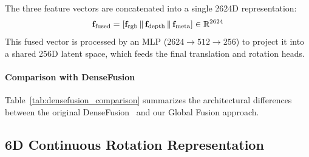 The three feature vectors are concatenated into a single 2624D representation:
\begin{equation}
    \mathbf{f}_{\text{fused}} = [\mathbf{f}_{\text{rgb}} \,\|\, \mathbf{f}_{\text{depth}} \,\|\, \mathbf{f}_{\text{meta}}] \in \mathbb{R}^{2624}
    \label{eq:concat}
\end{equation}
This fused vector is processed by an MLP ($2624 \rightarrow 512 \rightarrow 256$) to project it into a shared 256D latent space, which feeds the final translation and rotation heads.

\paragraph{Comparison with DenseFusion}
Table~\ref{tab:densefusion_comparison} summarizes the architectural differences between the original DenseFusion~\cite{wang2019densefusion} and our Global Fusion approach.

\begin{table}[t]
    \centering
    \caption{Comparison between DenseFusion and our Global Fusion architecture.}
    \label{tab:densefusion_comparison}
    \small
\end{table}

\subsection{6D Continuous Rotation Representation}
\label{sec:method_rotation6d}

